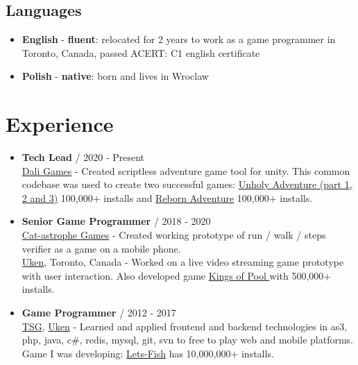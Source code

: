 \documentclass[12pt,a4paper]{article}
\begin{document}
\begin{multicols}{2}
\begin{samepage}
\section*{Languages }
\justifying
\begin{itemize}[leftmargin=*]
	\setlength\itemsep{0.0cm}
	\item \textbf{English} - \textbf{fluent}: relocated for 2 years to work as a game programmer in Toronto, Canada, passed ACERT: C1 english certificate  \\
	\item \textbf{Polish} - \textbf{native}: born and lives in Wroclaw \\	
\end{itemize} 
\end{samepage}

\vfill


\centering
\section*{Experience }
\begin{itemize}[leftmargin=*]
	\item \textbf{Tech Lead} / 2020 - Present \\
		{\href{https://dali.games/}{Dali Games}} - Created scriptless adventure game tool for unity. This common codebase was used to create two successful games: {\href{https://play.google.com/store/apps/details?id=games.dali.adventure.neighborhood.unholy}{Unholy Adventure (part 1, 2 and 3)}} 100,000+ installs and {\href{https://play.google.com/store/apps/details?id=games.dali.adventure.reborn}{Reborn Adventure}} 100,000+ installs.   \\
	\item \textbf{Senior Game Programmer} / 2018 - 2020\\
		{\href{https://cat-astrophe-games.com/}{Cat-astrophe Games}} - Created working prototype of run / walk / steps verifier as a game on a mobile phone. \\
		{\href{https://www.uken.com/}{Uken}}, Toronto, Canada  - Worked on a live video streaming game prototype with user interaction. Also developed game {\href{https://play.google.com/store/apps/details?id=com.uken.pool}{Kings of Pool }} with  500,000+ installs.  \\
	\item \textbf{Game Programmer} / 2012 - 2017\\ 
		{\href{https://tensquaregames.com/}{TSG}}, {\href{https://www.uken.com/}{Uken}} - Learned and applied frontend and backend technologies in as3, php, java, c\#, redis, mysql, git, svn to free to play web and mobile platforms. Game I was developing: {\href{https://play.google.com/store/apps/details?id=air.com.tensquaregames.letsfish}{Lets-Fish}} has 10,000,000+ installs.    \\	 
\end{itemize}


\end{multicols}
\end{document}

